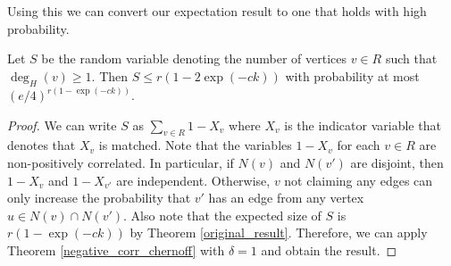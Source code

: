 Using this we can convert our expectation result to one that holds 
with high probability.

\begin{thm}
Let $S$ be the random variable denoting the number of vertices $v \in R$ such that $\deg_{H}(v)\geq 1$. Then
$ S \leq r(1-2\exp(-ck))$ with probability at most $(e/4)^{r(1-\exp(-ck))}$.
\end{thm}

\begin{proof}
We can write $S$ as $\sum_{v\in R} 1-X_v$ where $X_v$ is the indicator
variable that denotes that $X_v$ is matched. Note that the variables
$1-X_v$ for each $v\in R$ are non-positively correlated. In
particular, if $N(v)$ and $N(v')$ are disjoint, then $1-X_v$ and
$1-X_{v'}$ are independent. Otherwise, $v$ not claiming any edges can
only increase the probability that $v'$ has an edge from any vertex
$u\in N(v)\cap N(v')$. Also note that the expected size of $S$ is
$r(1-\exp(-ck))$ by Theorem \ref{original_result}. Therefore, we can
apply Theorem \ref{negative_corr_chernoff} with $\delta=1$ and obtain
the result.
\end{proof}
